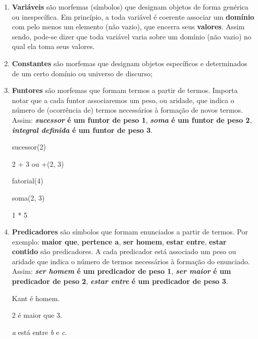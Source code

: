 \begin{enumerate}[label=\arabic*)]
    \item \textbf{Variáveis} são morfemas (símbolos) que designam objetos de forma genérica ou inespecífica.
    Em princípio, a toda variável é coerente associar um \textbf{domínio} com pelo menos um elemento (não vazio), que encerra seus \textbf{valores}.
    Assim sendo, pode-se dizer que toda variável varia sobre um domínio (não vazio) no qual ela toma seus valores.

    \item \textbf{Constantes} são morfemas que designam objetos específicos e determinados de um certo domínio ou universo de discurso;

    \item \textbf{Funtores} são morfemas que formam termos a partir de termos.
    Importa notar que a cada funtor associaremos um peso, ou aridade, que indica o número de (ocorrência de) termos necessários à formação de novos termos.
    Assim: \textbf{\textit{sucessor} é um funtor de peso 1}, \textbf{\textit{soma} é um funtor de peso 2}, \textbf{\textit{integral definida} é um funtor de peso 3}.

    \begin{exemplo}
            sucessor(2)
    \end{exemplo}
    \begin{exemplo}
            2 + 3 ou +(2, 3)
    \end{exemplo}
    \begin{exemplo}
            fatorial(4)
    \end{exemplo}
    \begin{exemplo}
            soma(2, 3)
    \end{exemplo}
    \begin{exemplo}
            1 * 5
    \end{exemplo}

    \item \textbf{Predicadores} são símbolos que formam enunciados a partir de termos.
    Por exemplo: \textbf{maior que}, \textbf{pertence a}, \textbf{ser homem}, \textbf{estar entre}, \textbf{estar contido} são predicadores.
    A cada predicador está associado um peso ou aridade que indica o número de termos necessários à formação do enunciado.
    Assim: \textbf{\textit{ser homem} é um predicador de peso 1}, \textbf{\textit{ser maior} é um predicador de peso 2}, \textbf{\textit{estar entre} é um predicador de peso 3}.

    \setcounter{exemplo}{0}
    \begin{exemplo}
        Kant é homem.
    \end{exemplo}
    \begin{exemplo}
        2 é maior que 3.
    \end{exemplo}
    \begin{exemplo}
        \textit{a} está entre \textit{b} e \textit{c}.
    \end{exemplo}


\end{enumerate}
